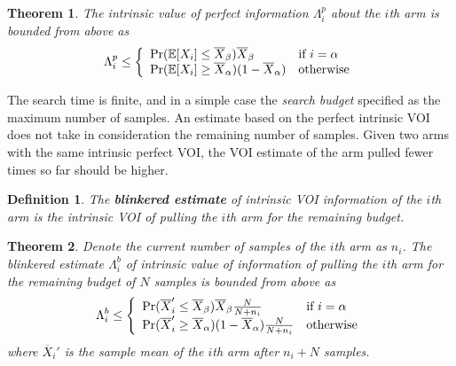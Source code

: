 \documentclass{article}
\newcommand {\IE} {\ensuremath {\mathbb{E}}}
\newtheorem{dfn}{Definition}
\newtheorem{thm}{Theorem}
\begin{document}
\begin{thm} The intrinsic value of perfect information $\Lambda_i^p$ about the $i$th arm is
  bounded from above as
\begin{equation}
  \Lambda_i^p \le \left\{
  \begin{array}{l l}
    \Pr(\IE[X_i] \le \overline X_\beta)\overline X_\beta & \mbox{if $i=\alpha$} \\
    \Pr(\IE[X_i] \ge \overline X_\alpha)(1-\overline X_\alpha) & \mbox{otherwise}
  \end{array} \right.
\label{eqn:thm-vopi}
\end{equation}
\end{thm}

The search time is finite, and in a simple case the \textit{search
  budget} specified as the maximum number of samples.
An estimate based on the perfect intrinsic VOI does not take in
consideration the remaining number of samples. Given two arms
with the same intrinsic perfect VOI, the VOI
estimate of the arm pulled fewer times so far should be higher.

\begin{dfn} The \textbf{blinkered estimate} of intrinsic VOI information of the
  $i$th arm is the intrinsic VOI of pulling the $i$th arm for the
  remaining budget.
\end{dfn}

\begin{thm} Denote the current number of samples of the $i$th arm as
  $n_i$. The blinkered estimate $\Lambda_i^b$ of intrinsic value of
  information of pulling the $i$th arm for the remaining budget of $N$
  samples is bounded from above as
\begin{equation}
  \Lambda_i^b \le \left\{
  \begin{array}{l l}
    \Pr(\overline X_i'\le\overline X_\beta)\overline X_\beta\frac N {N+n_i} & \mbox{if $i=\alpha$} \\
    \Pr(\overline X_i'\ge\overline X_\alpha)(1-\overline  X_\alpha)\frac N {N+n_i} &  \mbox{otherwise}
  \end{array} \right.
\label{eqn:thm-be}
\end{equation}
where $\overline X_i'$ is the sample mean of the $i$th arm after $n_i+N$ 
samples.
\end{thm}
\end{document}
